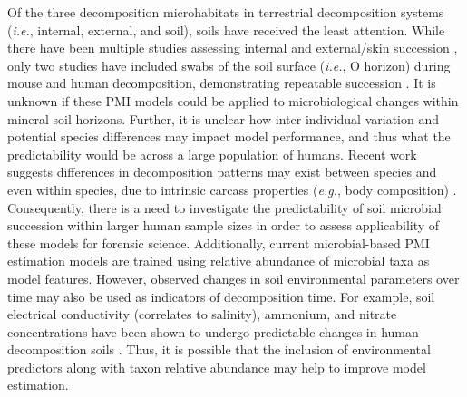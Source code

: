 \documentclass[
  10pt,
  letterpaper,
]{article}
\begin{document}
Of the three decomposition microhabitats in terrestrial decomposition
systems (\emph{i.e.}, internal, external, and soil), soils have received
the least attention. While there have been multiple studies assessing
internal and external/skin succession
\citep{pechal_potential_2014, johnson_machine_2016, metcalf_microbial_2016, liu_predicting_2020, hu_predicting_2021, belk_microbiome_2018},
only two studies have included swabs of the soil surface (\emph{i.e.}, O
horizon) during mouse and human decomposition, demonstrating repeatable
succession \citep{belk_microbiome_2018, burcham_conserved_2024}. It is
unknown if these PMI models could be applied to microbiological changes
within mineral soil horizons. Further, it is unclear how
inter-individual variation and potential species differences may impact
model performance, and thus what the predictability would be across a
large population of humans. Recent work suggests differences in
decomposition patterns may exist between species
\citep{dautartas_differential_2018, debruyn_comparative_2021} and even
within species, due to intrinsic carcass properties (\emph{e.g.}, body
composition) \citep{mason_body_2022}. Consequently, there is a need to
investigate the predictability of soil microbial succession within
larger human sample sizes in order to assess applicability of these
models for forensic science. Additionally, current microbial-based PMI
estimation models are trained using relative abundance of microbial taxa
as model features. However, observed changes in soil environmental
parameters over time may also be used as indicators of decomposition
time. For example, soil electrical conductivity (correlates to
salinity), ammonium, and nitrate concentrations have been shown to
undergo predictable changes in human decomposition soils
\citep{aitkenhead-peterson_mapping_2012, fancher_evaluation_2017, taylor_soil_2023}.
Thus, it is possible that the inclusion of environmental predictors
along with taxon relative abundance may help to improve model
estimation.
\end{document}

